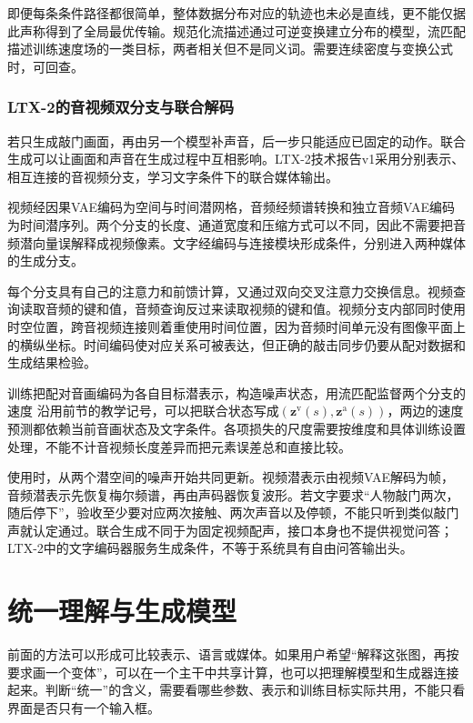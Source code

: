 即便每条条件路径都很简单，整体数据分布对应的轨迹也未必是直线，更不能仅据此声称得到了全局最优传输。规范化流描述通过可逆变换建立分布的模型，流匹配描述训练速度场的一类目标，两者相关但不是同义词。需要连续密度与变换公式时，可回查。

\subsubsection{LTX-2的音视频双分支与联合解码}
\label{sec:vision-models-ltx2}

若只生成敲门画面，再由另一个模型补声音，后一步只能适应已固定的动作。联合生成可以让画面和声音在生成过程中互相影响。LTX-2技术报告v1采用分别表示、相互连接的音视频分支，学习文字条件下的联合媒体输出。

视频经因果VAE编码为空间与时间潜网格，音频经频谱转换和独立音频VAE编码为时间潜序列。两个分支的长度、通道宽度和压缩方式可以不同，因此不需要把音频潜向量误解释成视频像素。文字经编码与连接模块形成条件，分别进入两种媒体的生成分支。

每个分支具有自己的注意力和前馈计算，又通过双向交叉注意力交换信息。视频查询读取音频的键和值，音频查询反过来读取视频的键和值。视频分支内部同时使用时空位置，跨音视频连接则着重使用时间位置，因为音频时间单元没有图像平面上的横纵坐标。时间编码使对应关系可被表达，但正确的敲击同步仍要从配对数据和生成结果检验。

训练把配对音画编码为各自目标潜表示，构造噪声状态，用流匹配监督两个分支的速度
沿用前节的教学记号，可以把联合状态写成$(\bm z^{\mathrm v}(s),\bm z^{\mathrm a}(s))$，两边的速度预测都依赖当前音画状态及文字条件。各项损失的尺度需要按维度和具体训练设置处理，不能不计音视频长度差异而把元素误差总和直接比较。

使用时，从两个潜空间的噪声开始共同更新。视频潜表示由视频VAE解码为帧，音频潜表示先恢复梅尔频谱，再由声码器恢复波形。若文字要求“人物敲门两次，随后停下”，验收至少要对应两次接触、两次声音以及停顿，不能只听到类似敲门声就认定通过。联合生成不同于为固定视频配声，接口本身也不提供视觉问答；LTX-2中的文字编码器服务生成条件，不等于系统具有自由问答输出头。

\section{统一理解与生成模型}
\label{sec:vision-models-unified}

前面的方法可以形成可比较表示、语言或媒体。如果用户希望“解释这张图，再按要求画一个变体”，可以在一个主干中共享计算，也可以把理解模型和生成器连接起来。判断“统一”的含义，需要看哪些参数、表示和训练目标实际共用，不能只看界面是否只有一个输入框。

